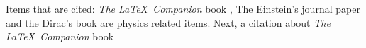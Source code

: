 Items that are cited: \textit{The \LaTeX\ Companion} book \cite{latexcompanion}, The Einstein's journal paper \cite{einstein} and the Dirac's book \cite{dirac} are physics related items. Next, a citation about \textit{The \LaTeX\ Companion} book \cite{latexcompanion} \cite{Koppe}
\cite{Koppe2}